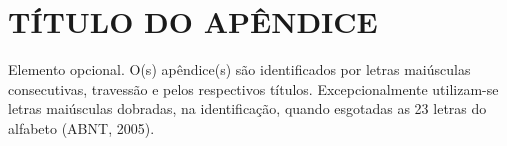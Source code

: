 \chapter{TÍTULO DO APÊNDICE}
\label{apend}


Elemento opcional. O(s) apêndice(s) são identificados por letras maiúsculas consecutivas, travessão e pelos respectivos títulos. Excepcionalmente utilizam-se letras maiúsculas dobradas, na identificação, quando esgotadas as 23 letras do alfabeto (ABNT, 2005).
